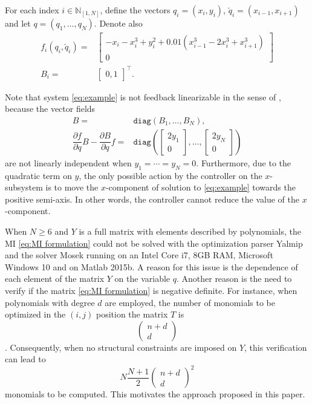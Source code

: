 \documentclass[10pt,twocolumn,twoside]{IEEEtran}
\theoremstyle{plain}
\theoremstyle{definition}
\theoremstyle{remark}
\begin{document}
For each index $i\in\mathbb{N}_{[1,N]}$, define the vectors $q_i=(x_i,y_i)$, $\breve{q}_i=(x_{i-1},x_{i+1})$ and let $q=(q_1,\ldots,q_N)$. Denote also
\begin{align*}
	f_i(q_i,\breve{q}_i)=&\begin{bmatrix}
		-x_i-x_i^3+y_i^2 + 0.01\left(x_{i-1}^3 - 2x_i^3 +x_{i+1}^3\right)\\
		0
	\end{bmatrix}\\
	B_i=&\begin{bmatrix}
	0, 1
	\end{bmatrix}^\top.
\end{align*}

Note that system \eqref{eq:example} is not feedback linearizable in the sense of \cite{Isidori:1995}, because the vector fields
\begin{align*}
	B=&\mathbin{\mathtt{diag}}(B_1,\ldots,B_N),\\
	\dfrac{\partial f}{\partial q}B-\dfrac{\partial B}{\partial q}f=&\mathbin{\mathtt{diag}}\left(\begin{bmatrix}
	2y_1\\0
	\end{bmatrix},\ldots,\begin{bmatrix}
	2y_N\\0
	\end{bmatrix}\right)
\end{align*}
are not linearly independent when $y_1=\cdots=y_N=0$.  Furthermore, due to the quadratic term on $y$, the only possible action by the controller on the $x$-subsystem is to move the $x$-component of solution to \eqref{eq:example} towards the positive semi-axis. In other words, the controller cannot reduce the value of the $x$-component.

When $N\geq6$ and $Y$ is a full matrix with elements described by polynomials, the MI \eqref{eq:MI formulation} could not be solved with the optimization parser Yalmip \cite{Loefberg2004,Loefberg2009} and the solver Mosek running on an Intel Core i7, 8GB RAM, Microsoft Windows 10 and on Matlab 2015b. A reason for this issue is the dependence of each element of the matrix $Y$ on the variable $q$. Another reason is the need to verify if the matrix \eqref{eq:MI formulation} is negative definite. For instance, when  polynomials with degree $d$ are employed, the number of monomials to be optimized in the $(i,j)$ position the matrix $T$ is
\begin{equation*}
		\begin{pmatrix}
n+d\\ d
\end{pmatrix}
\end{equation*}
\cite{Waki2006}. Consequently, when no structural constraints are imposed on $Y$, this verification can lead to
\begin{equation*}
N\dfrac{N+1}{2}\begin{pmatrix}
n+d\\ d
\end{pmatrix}^2
\end{equation*}
monomials to be computed. This motivates the approach proposed in this paper.
\end{document}
